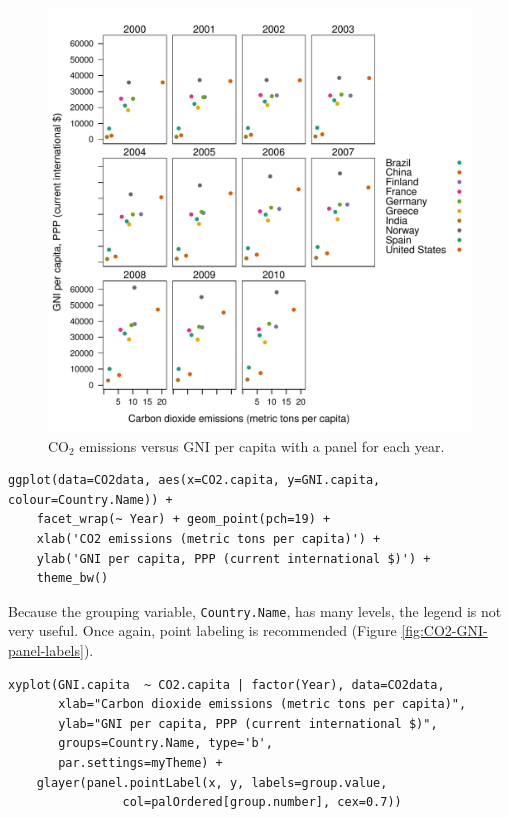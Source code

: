 \begin{figure}[htb]
\centering
\includegraphics[width=.9\linewidth]{figs/CO2_capita_panel.pdf}
\caption{\label{fig:CO2-GNI-panel}$\mathrm{CO_2}$ emissions versus GNI per capita with a panel for each year.}
\end{figure}

\lstset{language=R,numbers=none}
\begin{lstlisting}
ggplot(data=CO2data, aes(x=CO2.capita, y=GNI.capita, colour=Country.Name)) +
    facet_wrap(~ Year) + geom_point(pch=19) + 
    xlab('CO2 emissions (metric tons per capita)') +
    ylab('GNI per capita, PPP (current international $)') +
    theme_bw()
\end{lstlisting}

Because the grouping variable, \texttt{Country.Name}, has many levels, the
legend is not very useful. Once again, point labeling is recommended
(Figure \ref{fig:CO2-GNI-panel-labels}).

\lstset{language=R,numbers=none}
\begin{lstlisting}
xyplot(GNI.capita  ~ CO2.capita | factor(Year), data=CO2data,
       xlab="Carbon dioxide emissions (metric tons per capita)",
       ylab="GNI per capita, PPP (current international $)",
       groups=Country.Name, type='b',
       par.settings=myTheme) + 
    glayer(panel.pointLabel(x, y, labels=group.value,
			    col=palOrdered[group.number], cex=0.7))
\end{lstlisting}

